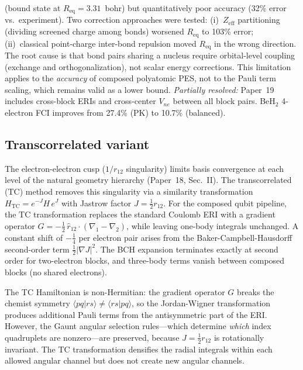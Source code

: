\documentclass[aps,pra,twocolumn,superscriptaddress,longbibliography]{revtex4-2}
\begin{document}
\begin{enumerate}
  (bound state at $R_{\mathrm{eq}} = 3.31$~bohr) but quantitatively
  poor accuracy (32\% error vs.\ experiment).  Two correction approaches
  were tested: (i)~$Z_{\mathrm{eff}}$ partitioning (dividing screened
  charge among bonds) worsened $R_{\mathrm{eq}}$ to 103\% error;
  (ii)~classical point-charge inter-bond repulsion moved
  $R_{\mathrm{eq}}$ in the wrong direction.  The root cause is that bond
  pairs sharing a nucleus require orbital-level coupling (exchange and
  orthogonalization), not scalar energy corrections.  This limitation
  applies to the \emph{accuracy} of composed polyatomic PES, not to the
  Pauli term scaling, which remains valid as a lower bound.
  \textit{Partially resolved:} Paper~19 includes cross-block ERIs
  and cross-center $V_{ne}$ between all block pairs.  BeH$_2$
  4-electron FCI improves from 27.4\% (PK) to 10.7\% (balanced).
\end{enumerate}


\subsection{Transcorrelated variant}
\label{sec:tc_composed}

The electron-electron cusp ($1/r_{12}$ singularity) limits basis
convergence at each level of the natural geometry hierarchy
(Paper~18, Sec.~II).  The transcorrelated (TC) method removes
this singularity via a similarity transformation
$H_{\mathrm{TC}} = e^{-J} H\, e^{J}$ with Jastrow factor
$J = \tfrac{1}{2} r_{12}$.  For the composed qubit pipeline,
the TC transformation replaces the standard Coulomb ERI with a
gradient operator $G = -\tfrac{1}{2}\,\hat{r}_{12} \cdot
(\nabla_1 - \nabla_2)$, while leaving one-body integrals unchanged.
A constant shift of $-\tfrac{1}{4}$ per electron pair arises from
the Baker-Campbell-Hausdorff second-order term
$\tfrac{1}{2}|\nabla J|^2$.  The BCH expansion terminates exactly
at second order for two-electron blocks, and three-body terms vanish
between composed blocks (no shared electrons).

The TC Hamiltonian is non-Hermitian: the gradient operator $G$ breaks
the chemist symmetry $\langle pq|rs\rangle \ne \langle rs|pq\rangle$,
so the Jordan-Wigner transformation produces additional Pauli terms
from the antisymmetric part of the ERI.  However, the Gaunt angular
selection rules---which determine \emph{which} index quadruplets are
nonzero---are preserved, because $J = \tfrac{1}{2}r_{12}$ is
rotationally invariant.  The TC transformation densifies the radial
integrals within each allowed angular channel but does not create
new angular channels.
\end{document}
